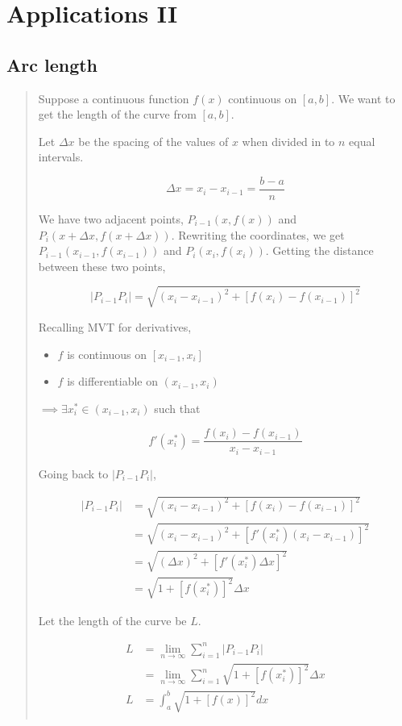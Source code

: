 \documentclass[
]{article}
\begin{document}
\hypertarget{applications-ii}{%
\section{Applications II}\label{applications-ii}}

\hypertarget{arc-length}{%
\subsection{Arc length}\label{arc-length}}

\begin{quote}
Suppose a continuous function \(f(x)\) continuous on \([a,b]\). We want
to get the length of the curve from \([a,b]\).

Let \(\Delta x\) be the spacing of the values of \(x\) when divided in
to \(n\) equal intervals.

\[\Delta x = x_i - x_{i-1} = \frac{b-a}{n} \]

We have two adjacent points, \(P_{i-1}(x, f(x))\) and
\(P_i(x+\Delta x, f(x + \Delta x))\). Rewriting the coordinates, we get
\(P_{i-1}(x_{i-1}, f(x_{i-1}))\) and \(P_i(x_i, f(x_i))\). Getting the
distance between these two points,

\[|P_{i-1}P_i| = \sqrt{(x_i-x_{i-1})^2 + \left[ f(x_i)-f(x_{i-1}) \right]^2}\]

Recalling MVT for derivatives,

\begin{itemize}
\item
  \(f\) is continuous on \([x_{i-1},x_i]\)
\item
  \(f\) is differentiable on \((x_{i-1},x_i)\)
\end{itemize}

\(\implies \exists x_i^* \in (x_{i-1},x_i)\) such that

\[f'(x_i^*) = \frac{f(x_i) - f(x_{i-1})}{x_i - x_{i-1}}\]

Going back to \(|P_{i-1}P_i|\),

\begin{align*}
|P_{i-1}P_i| &= \sqrt{(x_i-x_{i-1})^2 + \left[ f(x_i)-f(x_{i-1}) \right]^2}\\
&= \sqrt{(x_i-x_{i-1})^2 + \left[ f'(x_i^*) (x_i - x_{i-1}) \right]^2}\\
&= \sqrt{(\Delta x)^2 + \left[ f'(x_i^*) \Delta x \right]^2}\\
&= \sqrt{1+[f(x_i^*)]^2}\Delta x
\end{align*}

Let the length of the curve be \(L\).

\begin{align*}
L &= \lim_{n\to\infty} \sum_{i=1}^n |P_{i-1}P_i|\\
&= \lim_{n\to\infty} \sum_{i=1}^n \sqrt{1+[f(x_i^*)]^2}\Delta x\\
L &= \int_a^b \sqrt{1+[f(x)]^2}dx\\
\end{align*}
\end{quote}
\end{document}
